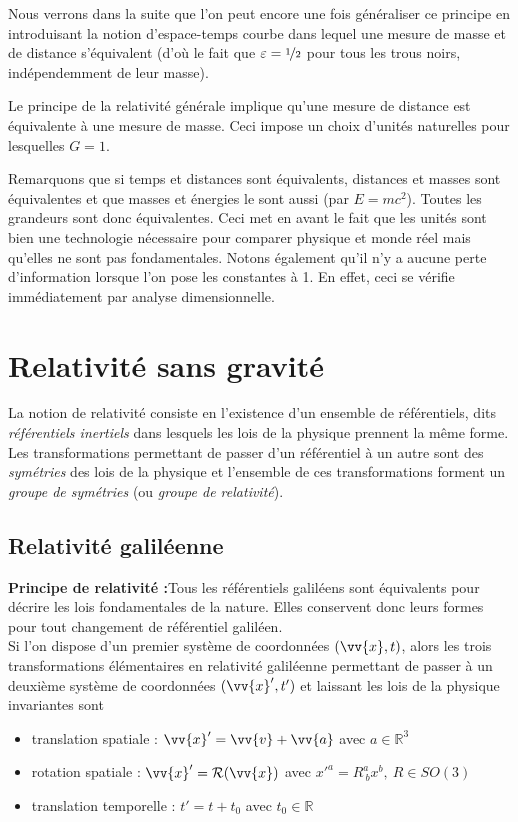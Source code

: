 \documentclass[a4paper,11pt]{report}
\theoremstyle{definition}
\theoremstyle{plain}
\theoremstyle{definition}
\theoremstyle{remark}
\begin{document}
        Nous verrons dans la suite que l'on peut encore une fois généraliser ce principe en introduisant la notion d'espace-temps courbe dans lequel une mesure de masse et de distance s'équivalent (d'où le fait que $\varepsilon = \nicefrac{1}{2}$ pour tous les trous noirs, indépendemment de leur masse).
        
        \begin{leftbar}
            Le principe de la relativité générale implique qu'une mesure de distance est équivalente à une mesure de masse. Ceci impose un choix d'unités naturelles pour lesquelles $G = 1$.
        \end{leftbar}
        
        Remarquons que si temps et distances sont équivalents, distances et masses sont équivalentes et que masses et énergies le sont aussi (par $E = mc^2$). Toutes les grandeurs sont donc équivalentes. Ceci met en avant le fait que les unités sont bien une technologie nécessaire pour comparer physique et monde réel mais qu'elles ne sont pas fondamentales. Notons également qu'il n'y a aucune perte d'information lorsque l'on pose les constantes à 1. En effet, ceci se vérifie immédiatement par analyse dimensionnelle.

\chapter{Relativité sans gravité}

    La notion de relativité consiste en l'existence d'un ensemble de référentiels, dits \textit{référentiels inertiels} dans lesquels les lois de la physique prennent la même forme. Les transformations permettant de passer d'un référentiel à un autre sont des \textit{symétries} des lois de la physique et l'ensemble de ces transformations forment un \textit{groupe de symétries} (ou \textit{groupe de relativité}).

    \section{Relativité galiléenne}
    
        \textbf{Principe de relativité :}\quad Tous les référentiels galiléens sont équivalents pour décrire les lois fondamentales de la nature. Elles conservent donc leurs formes pour tout changement de référentiel galiléen.\\
    
        Si l'on dispose d'un premier système de coordonnées $(\vv{x},t)$, alors les trois transformations élémentaires en relativité galiléenne permettant de passer à un deuxième système de coordonnées $(\vv{x}',t')$ et laissant les lois de la physique invariantes sont
        \begin{itemize}[label = \textbullet]
            \item translation spatiale : $\vv{x}' = \vv{v}+\vv{a}$ avec $a\in\mathbb{R}^3$
            \item rotation spatiale : $\vv{x}' = \mathcal{R}(\vv{x})$ avec $x'^a = R^a_{~b}x^b,~R\in SO(3)$
            \item translation temporelle : $t' = t + t_0$ avec $t_0\in\mathbb{R}$
        \end{itemize}
        
\end{document}
